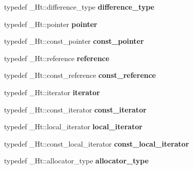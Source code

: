 \begin{DoxyCompactItemize}
typedef \+\_\+\+Ht\+::difference\+\_\+type {\bfseries difference\+\_\+type}
\item 
\mbox{\label{classunordered__multiset_abf50d22aa82cad63c910cd798a4b35a3}} 
typedef \+\_\+\+Ht\+::pointer {\bfseries pointer}
\item 
\mbox{\label{classunordered__multiset_a698cb25539a8445a2a9089f036e07ac0}} 
typedef \+\_\+\+Ht\+::const\+\_\+pointer {\bfseries const\+\_\+pointer}
\item 
\mbox{\label{classunordered__multiset_abd5bd70733d1643812f14f1366c7c4b4}} 
typedef \+\_\+\+Ht\+::reference {\bfseries reference}
\item 
\mbox{\label{classunordered__multiset_a8f98944b22e3e4de999678150444c820}} 
typedef \+\_\+\+Ht\+::const\+\_\+reference {\bfseries const\+\_\+reference}
\item 
\mbox{\label{classunordered__multiset_a93885fb17aa1cd963c3a4c53a1d97821}} 
typedef \+\_\+\+Ht\+::iterator {\bfseries iterator}
\item 
\mbox{\label{classunordered__multiset_ae2196d670ca163f24d4c97ac73031f68}} 
typedef \+\_\+\+Ht\+::const\+\_\+iterator {\bfseries const\+\_\+iterator}
\item 
\mbox{\label{classunordered__multiset_a62984e7f5a40424c79702851f626053e}} 
typedef \+\_\+\+Ht\+::local\+\_\+iterator {\bfseries local\+\_\+iterator}
\item 
\mbox{\label{classunordered__multiset_a1c93a1315a5a03cc444e6385189d70cb}} 
typedef \+\_\+\+Ht\+::const\+\_\+local\+\_\+iterator {\bfseries const\+\_\+local\+\_\+iterator}
\item 
\mbox{\label{classunordered__multiset_adadd05a84f21a4c70fd65b27fdce93f7}} 
typedef \+\_\+\+Ht\+::allocator\+\_\+type {\bfseries allocator\+\_\+type}
\end{DoxyCompactItemize}

